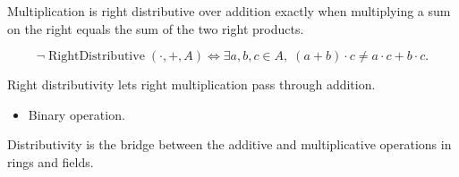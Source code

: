 \begin{remark*}
Multiplication is right distributive over addition exactly when multiplying a
sum on the right equals the sum of the two right products.
\end{remark*}

\begin{remark*}
\[
\neg\operatorname{RightDistributive}(\cdot,+,A)
\Longleftrightarrow
\exists a,b,c\in A,\; (a+b)\cdot c\neq a\cdot c+b\cdot c.
\]
\end{remark*}

\begin{remark*}[Interpretation]
Right distributivity lets right multiplication pass through addition.
\end{remark*}

\begin{remark*}[Dependencies]
\begin{itemize}
  \item Binary operation.
\end{itemize}
\end{remark*}

\begin{remark*}[Interpretation]
Distributivity is the bridge between the additive and multiplicative
operations in rings and fields.
\end{remark*}
